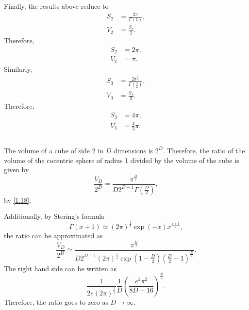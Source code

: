 Finally, the results above reduce to
%
\begin{equation}
\begin{aligned}
S_2 
&= 
\frac{2 \pi}{\Gamma(1)}, \\
V_2 
&= 
\frac{S_2}{2}. 
\end{aligned}
\end{equation}
%
Therefore, 
%
\begin{equation}
\begin{aligned}
S_2 
&= 
2 \pi, \\
V_2 
&= 
\pi. 
\end{aligned}
\end{equation}
%
Similarly,
%
\begin{equation}
\begin{aligned}
S_3 
&= 
\frac{2 \pi ^ \frac{3}{2}}
{\Gamma 
\left( 
	\frac{3}{2} 
\right)}, \\
V_3 
&= 
\frac{S_3}{3}. 
\end{aligned}
\end{equation}
%
Therefore, 
%
\begin{equation}
\begin{aligned}
S_3 
&= 
4 \pi, \\
V_3 
&= 
\frac{4}{3} \pi. 
\end{aligned}
\end{equation}
%


\subsection{}
\label{1.19}
The volume of a cube of side 2 in $D$ dimensions is $2 ^ D$. 
Therefore, the ratio of the volume of the cocentric sphere of radius 1 divided by the volume of the cube is given by
%
\begin{equation}
\frac{V_D}{2 ^ D} 
= 
\frac{\pi ^ \frac{D}{2}}{D 2 ^ {D - 1} 
\Gamma 
\left( 
	\frac{D}{2} 
\right)},
\end{equation}
%
by \ref{1.18}.

Additionally, by Stering's formula
%
\begin{equation}
\Gamma(x + 1) 
\simeq 
(2 \pi) ^ \frac{1}{2} 
\exp(- x) 
x ^ \frac{x + 1}{2},
\end{equation}
%
the ratio can be approximated as
%
\begin{equation}
\frac{V_D}{2 ^ D} 
\simeq 
\frac
{\pi ^ \frac{D}{2}}
{D 2 ^ {D - 1} 
(2 \pi) ^ \frac{1}{2} 
\exp 
\left( 
	1 
	- 
	\frac{D}{2} 
\right) 
\left( 
	\frac{D}{2} 
	- 
	1 
\right) ^ \frac{D}{4}}.
\end{equation}
%
The right hand side can be written as 
%
\begin{equation}
\frac{1}{2 e (2 \pi) ^ \frac{1}{2}} 
\frac{1}{D} 
\left( 
	\frac{e ^ 2 \pi ^ 2}{ 8 D - 16} 
\right) ^ \frac{D}{4}.
\end{equation}
%
Therefore, the ratio goes to zero as $D \to \infty$.

